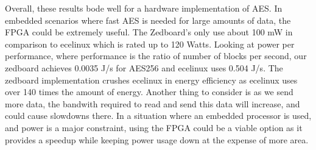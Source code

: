 Overall, these results bode well for a hardware implementation of AES. In embedded scenarios where fast AES is needed for large amounts of data, the FPGA could be extremely useful. The Zedboard's only use about 100 mW in comparison to ecelinux which is rated up to 120 Watts. Looking at power per performance, where performance is the ratio of number of blocks per second, our zedboard achieves 0.0035 J/s for AES256 and ecelinux uses 0.504 J/s. The zedboard implementation crushes ecelinux in energy efficiency as ecelinux uses over 140 times the amount of energy. Another thing to consider is as we send more data, the bandwith required to read and send this data will increase, and could cause slowdowns there. In a situation where an embedded processor is used, and power is a major constraint, using the FPGA could be a viable option as it provides a speedup while keeping power usage down at the expense of more area. 